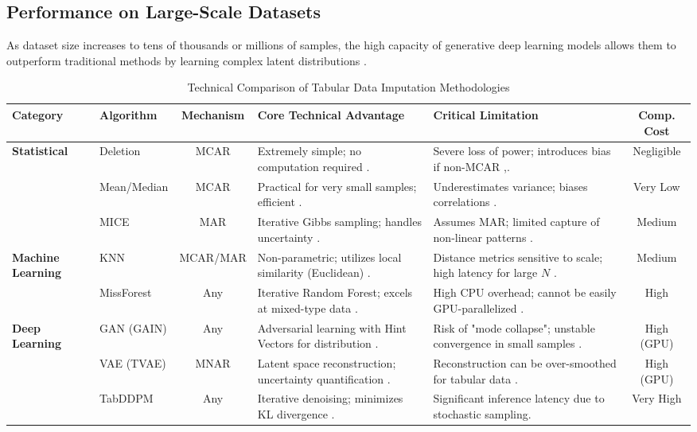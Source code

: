 \documentclass[twocolumn, 9pt]{extarticle}
\begin{document}
\subsection{Performance on Large-Scale Datasets}
As dataset size increases to tens of thousands or millions of samples, the high capacity of generative deep learning models allows them to outperform traditional methods by learning complex latent distributions \cite{sun2023deep}.

\begin{table}[htbp]
\centering
\caption{Technical Comparison of Tabular Data Imputation Methodologies}
\label{tab:imputation_comprehensive}
\begin{tabularx}{\textwidth}{|l|l|c|X|X|c|}
\hline
\textbf{Category} & \textbf{Algorithm} & \textbf{Mechanism} & \textbf{Core Technical Advantage} & \textbf{Critical Limitation} & \textbf{Comp. Cost} \\ \hline
\multirow{3}{*}{\textbf{Statistical}} & Deletion & MCAR & Extremely simple; no computation required \cite{little2019statistical}. & Severe loss of power; introduces bias if non-MCAR \cite{popovich2025treat},\cite{little2019statistical}. & Negligible \\ \cline{2-6} 
 & Mean/Median & MCAR & Practical for very small samples; efficient \cite{popovich2025treat}. & Underestimates variance; biases correlations \cite{popovich2025treat}. & Very Low \\ \cline{2-6} 
 & MICE & MAR & Iterative Gibbs sampling; handles uncertainty \cite{Azur2011}. & Assumes MAR; limited capture of non-linear patterns \cite{Azur2011}. & Medium \\ \hline
\multirow{2}{*}{\textbf{Machine Learning}} & KNN & MCAR/MAR & Non-parametric; utilizes local similarity (Euclidean) \cite{Bertsimas2018}. & Distance metrics sensitive to scale; high latency for large $N$ \cite{Bertsimas2018}. & Medium \\ \cline{2-6} 
 & MissForest & Any & Iterative Random Forest; excels at mixed-type data \cite{Stekhoven2012}. & High CPU overhead; cannot be easily GPU-parallelized \cite{Stekhoven2012}. & High \\ \hline
\multirow{3}{*}{\textbf{Deep Learning}} & GAN (GAIN) & Any & Adversarial learning with Hint Vectors for distribution \cite{Yoon2018}. & Risk of "mode collapse"; unstable convergence in small samples \cite{Yoon2018}. & High (GPU) \\ \cline{2-6} 
 & VAE (TVAE) & MNAR & Latent space reconstruction; uncertainty quantification \cite{Mattei2019}. & Reconstruction can be over-smoothed for tabular data \cite{Grinsztajn2022}. & High (GPU) \\ \cline{2-6} 
 & TabDDPM & Any & Iterative denoising; minimizes KL divergence \cite{Kotelnikov2023}. & Significant inference latency due to stochastic sampling. & Very High \\ \hline

\end{tabularx}
\end{table}
\end{document}
